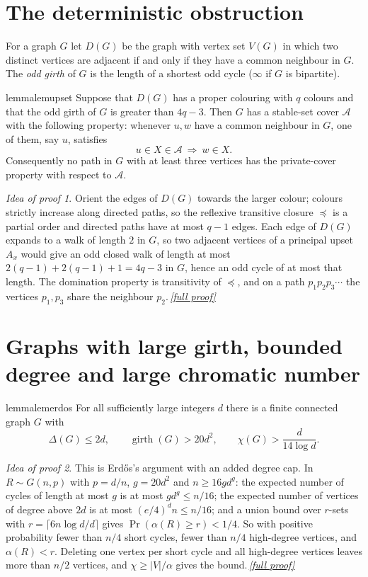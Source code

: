 \documentclass[11pt,a4paper]{article}
\theoremstyle{plain}
\theoremstyle{definition}
\theoremstyle{remark}
\newtheorem*{proofidea}{Idea of proof}
\newcommand{\fullproofref}[1]{\,\hyperref[#1]{\textit{[full proof]}}}
\newcommand{\cA}{\mathcal A}
\DeclareMathOperator{\girth}{girth}
\begin{document}
\section{The deterministic obstruction}

For a graph $G$ let $D(G)$ be the graph with vertex set $V(G)$ in which two distinct vertices are adjacent if and only if they have a common neighbour in $G$. The \emph{odd girth} of $G$ is the length of a shortest odd cycle ($\infty$ if $G$ is bipartite).

\begin{restatable}{lemma}{lemupset}\label{lem:upset}
Suppose that $D(G)$ has a proper colouring with $q$ colours and that the odd girth of $G$ is greater than $4q-3$. Then $G$ has a stable-set cover $\cA$ with the following property: whenever $u,w$ have a common neighbour in $G$, one of them, say $u$, satisfies
\[
 u\in X\in\cA\ \Longrightarrow\ w\in X .
\]
Consequently no path in $G$ with at least three vertices has the private-cover property with respect to $\cA$.
\end{restatable}
\begin{proofidea}
Orient the edges of $D(G)$ towards the larger colour; colours strictly increase along directed paths, so the reflexive transitive closure $\preceq$ is a partial order and directed paths have at most $q-1$ edges. Each edge of $D(G)$ expands to a walk of length $2$ in $G$, so two adjacent vertices of a principal upset $A_x$ would give an odd closed walk of length at most $2(q-1)+2(q-1)+1=4q-3$ in $G$, hence an odd cycle of at most that length. The domination property is transitivity of $\preceq$, and on a path $p_1p_2p_3\cdots$ the vertices $p_1,p_3$ share the neighbour $p_2$.\fullproofref{pf:upset}
\end{proofidea}

\section{Graphs with large girth, bounded degree and large chromatic number}

\begin{restatable}{lemma}{lemerdos}\label{lem:erdos}
For all sufficiently large integers $d$ there is a finite connected graph $G$ with
\[
 \Delta(G)\le2d,\qquad \girth(G)>20d^2,\qquad \chi(G)>\frac{d}{14\log d}.
\]
\end{restatable}
\begin{proofidea}
This is Erdős's argument \cite{Erdos59} with an added degree cap. In $R\sim G(n,p)$ with $p=d/n$, $g=20d^2$ and $n\ge16gd^g$: the expected number of cycles of length at most $g$ is at most $gd^g\le n/16$; the expected number of vertices of degree above $2d$ is at most $(e/4)^dn\le n/16$; and a union bound over $r$-sets with $r=\lceil6n\log d/d\rceil$ gives $\Pr(\alpha(R)\ge r)<1/4$. So with positive probability fewer than $n/4$ short cycles, fewer than $n/4$ high-degree vertices, and $\alpha(R)<r$. Deleting one vertex per short cycle and all high-degree vertices leaves more than $n/2$ vertices, and $\chi\ge|V|/\alpha$ gives the bound.\fullproofref{pf:erdos}
\end{proofidea}
\end{document}
